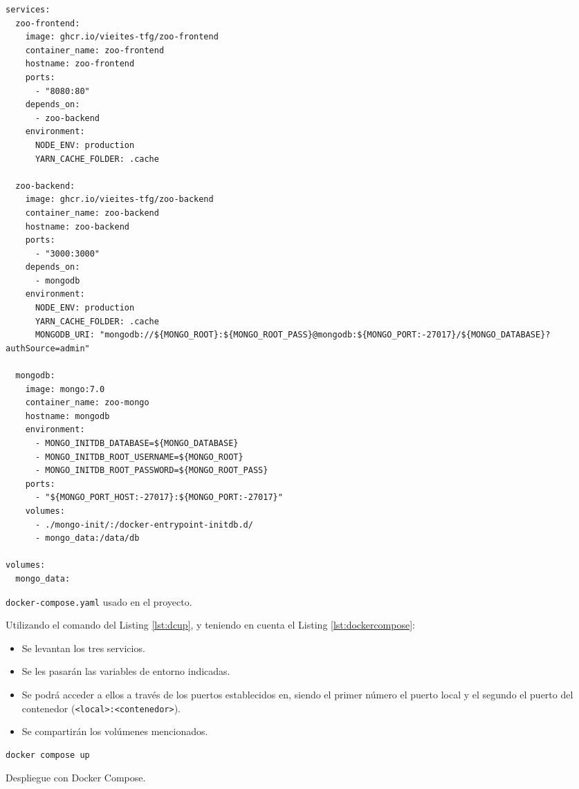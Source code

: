 \begin{longlisting}
  \begin{verbatim}
services:
  zoo-frontend:
    image: ghcr.io/vieites-tfg/zoo-frontend
    container_name: zoo-frontend
    hostname: zoo-frontend
    ports:
      - "8080:80"
    depends_on:
      - zoo-backend
    environment:
      NODE_ENV: production
      YARN_CACHE_FOLDER: .cache

  zoo-backend:
    image: ghcr.io/vieites-tfg/zoo-backend
    container_name: zoo-backend
    hostname: zoo-backend
    ports:
      - "3000:3000"
    depends_on:
      - mongodb
    environment:
      NODE_ENV: production
      YARN_CACHE_FOLDER: .cache
      MONGODB_URI: "mongodb://${MONGO_ROOT}:${MONGO_ROOT_PASS}@mongodb:${MONGO_PORT:-27017}/${MONGO_DATABASE}?authSource=admin"

  mongodb:
    image: mongo:7.0
    container_name: zoo-mongo
    hostname: mongodb
    environment:
      - MONGO_INITDB_DATABASE=${MONGO_DATABASE}
      - MONGO_INITDB_ROOT_USERNAME=${MONGO_ROOT}
      - MONGO_INITDB_ROOT_PASSWORD=${MONGO_ROOT_PASS}
    ports:
      - "${MONGO_PORT_HOST:-27017}:${MONGO_PORT:-27017}"
    volumes:
      - ./mongo-init/:/docker-entrypoint-initdb.d/
      - mongo_data:/data/db

volumes:
  mongo_data:
\end{verbatim}
\caption{\texttt{docker-compose.yaml} usado en el proyecto.}
\label{lst:dockercompose}
\end{longlisting}

Utilizando el comando del Listing \ref{lst:dcup}, y teniendo en cuenta el Listing \ref{lst:dockercompose}:

\begin{itemize}
  \item Se levantan los tres servicios.
  \item Se les pasarán las variables de entorno indicadas.
  \item Se podrá acceder a ellos a través de los puertos establecidos en, siendo el primer número el puerto local y el segundo el puerto del contenedor (\texttt{<local>:<contenedor>}).
  \item Se compartirán los volúmenes mencionados.
\end{itemize}

\begin{listing}[!ht]
  \begin{verbatim}
docker compose up
\end{verbatim}
\caption{Despliegue con Docker Compose.}
\label{lst:dcup}
\end{listing}

